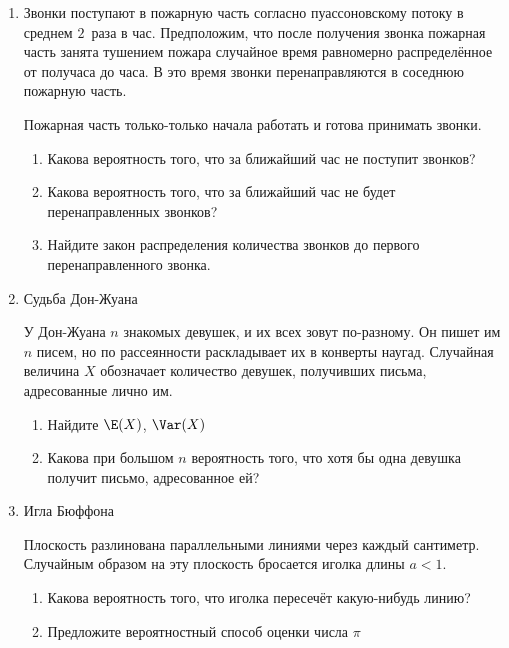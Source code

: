 \begin{enumerate}

\item Звонки поступают в пожарную часть согласно пуассоновскому потоку в среднем $2$~раза в час. Предположим, что после получения звонка пожарная часть занята тушением пожара случайное время равномерно распределённое от получаса до часа. В это время звонки перенаправляются в соседнюю пожарную часть.

Пожарная часть только-только начала работать и готова принимать звонки.
\begin{enumerate}
\item Какова вероятность того, что за ближайший час не поступит звонков?
\item Какова вероятность того, что за ближайший час не будет перенаправленных звонков?
\item Найдите закон распределения количества звонков до первого перенаправленного звонка.
\end{enumerate}

\item  Судьба Дон-Жуана


У Дон-Жуана $n$  знакомых девушек, и их всех зовут по-разному. Он пишет
им $n$  писем, но по рассеянности раскладывает их в конверты
наугад. Случайная величина $X$ обозначает количество девушек, получивших письма, адресованные лично им.

\begin{enumerate}
\item Найдите $\E(X)$, $\Var(X)$
\item Какова при большом $n$ вероятность того, что хотя бы одна девушка получит письмо, адресованное ей?
\end{enumerate}

\item Игла Бюффона

Плоскость разлинована параллельными линиями через каждый сантиметр. Случайным образом на эту плоскость бросается иголка длины $a<1$.

\begin{enumerate}
\item Какова вероятность того, что иголка пересечёт какую-нибудь линию?
\item Предложите вероятностный способ оценки числа $\pi$
\end{enumerate}


\end{enumerate}


